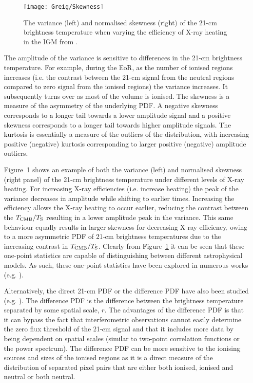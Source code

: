 \begin{figure}[]
\begin{center}
\texttt{[image: Greig/Skewness]}
\end{center}
\caption{The variance (left) and normalised skewness (right) of the 21-cm brightness temperature when varying the efficiency of X-ray heating in the IGM from \cite{Watkinson:2015}.}
\label{fig:skewness}
\end{figure}

The amplitude of the variance is sensitive to differences in the 21-cm brightness temperature. For example, during the EoR, as the number of ionised regions increases (i.e. the contrast between the 21-cm signal from the neutral regions compared to zero signal from the ionised regions) the variance increases. It subsequently turns over as most of the volume is ionised. The skewness is a measure of the asymmetry of the underlying PDF. A negative skewness corresponds to a longer tail towards a lower amplitude signal and a positive skewness corresponds to a longer tail towards higher amplitude signals. The kurtosis is essentially a measure of the outliers of the distribution, with increasing positive (negative) kurtosis corresponding to larger positive (negative) amplitude outliers.

Figure~\ref{fig:skewness} shows an example of both the variance (left) and normalised skewness (right panel) of the 21-cm brightness temperature under different levels of X-ray heating. For increasing X-ray efficiencies (i.e. increase heating) the peak of the variance decreases in amplitude while shifting to earlier times. Increasing the efficiency allows the X-ray heating to occur earlier, reducing the contrast between the $T_{\rm CMB}/T_{\rm S}$ resulting in a lower amplitude peak in the variance. This same behaviour equally results in larger skewness for decreasing X-ray efficiency, owing to a more asymmetric PDF of 21-cm brightness temperatures due to the increasing contrast in $T_{\rm CMB}/T_{\rm S}$. Clearly from Figure~\ref{fig:skewness} it can be seen that these one-point statistics are capable of distinguishing between different astrophysical models. As such, these one-point statistics have been explored in numerous works (e.g. \cite{Wyithe:2007b,Harker:2009,Patil:2014,Watkinson:2014,Watkinson:2015,Kittiwisit:2016,Kubota:2016,Watkinson:2015b,Shimabukuro:2015,Ross:2017}).

Alternatively, the direct 21-cm PDF or the difference PDF have also been studied (e.g. \cite{Barkana:2008,Gluscevic:2010,Ichikawa:2010,Pan:2012}). The difference PDF is the difference between the brightness temperature separated by some spatial scale, $r$. The advantages of the difference PDF is that it can bypass the fact that interferometric observations cannot easily determine the zero flux threshold of the 21-cm signal and that it includes more data by being dependent on spatial scales (similar to two-point correlation functions or the power spectrum). The difference PDF can be more sensitive to the ionising sources and sizes of the ionised regions as it is a direct measure of the distribution of separated pixel pairs that are either both ionised, ionised and neutral or both neutral.

